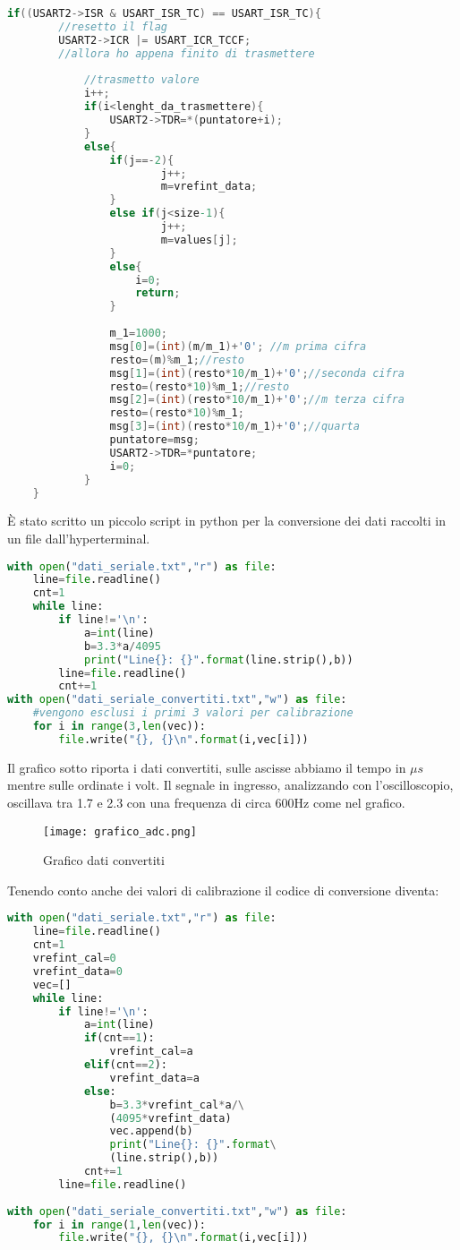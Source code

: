 \documentclass[main.tex]{subfiles}
\begin{document}
\begin{lstlisting}[caption=Interrupt USART2, language=C]
if((USART2->ISR & USART_ISR_TC) == USART_ISR_TC){
		//resetto il flag
		USART2->ICR |= USART_ICR_TCCF;
		//allora ho appena finito di trasmettere
		
			//trasmetto valore
			i++;
			if(i<lenght_da_trasmettere){
				USART2->TDR=*(puntatore+i);
			}
			else{
				if(j==-2){
						j++;
						m=vrefint_data;
				}
				else if(j<size-1){
						j++;
						m=values[j];
				}
				else{
					i=0; 
					return;
				}
				
				m_1=1000;
				msg[0]=(int)(m/m_1)+'0'; //m prima cifra
				resto=(m)%m_1;//resto
				msg[1]=(int)(resto*10/m_1)+'0';//seconda cifra
				resto=(resto*10)%m_1;//resto
				msg[2]=(int)(resto*10/m_1)+'0';//m terza cifra
				resto=(resto*10)%m_1;
				msg[3]=(int)(resto*10/m_1)+'0';//quarta
				puntatore=msg;
				USART2->TDR=*puntatore;
				i=0;
			}
	}
\end{lstlisting}
È stato scritto un piccolo script in python per la conversione dei dati raccolti in un file dall'hyperterminal. 
\begin{lstlisting}[caption=script.py,language=python]
with open("dati_seriale.txt","r") as file:
    line=file.readline()
    cnt=1
    while line:
        if line!='\n':
            a=int(line)
            b=3.3*a/4095
            print("Line{}: {}".format(line.strip(),b))
        line=file.readline()
        cnt+=1
with open("dati_seriale_convertiti.txt","w") as file:
    #vengono esclusi i primi 3 valori per calibrazione
    for i in range(3,len(vec)):
        file.write("{}, {}\n".format(i,vec[i]))
\end{lstlisting}
Il grafico sotto riporta i dati convertiti, sulle ascisse abbiamo il tempo in $\mu s$ mentre sulle ordinate i volt. Il segnale in ingresso, analizzando con l'oscilloscopio, oscillava tra 1.7 e 2.3 con una frequenza di circa 600Hz come nel grafico.
\begin{figure}[H]
    \centering
    \texttt{[image: grafico\_adc.png]}
    \caption{Grafico dati convertiti}
    \label{fig:grafico_adc}
\end{figure}
Tenendo conto anche dei valori di calibrazione il codice di conversione diventa:
\begin{lstlisting}[caption=script(cal).py,language=python]
with open("dati_seriale.txt","r") as file:
    line=file.readline()
    cnt=1
    vrefint_cal=0
    vrefint_data=0
    vec=[]
    while line:
        if line!='\n':
            a=int(line)
            if(cnt==1):
                vrefint_cal=a
            elif(cnt==2):
                vrefint_data=a
            else:
                b=3.3*vrefint_cal*a/\
                (4095*vrefint_data)
                vec.append(b)
                print("Line{}: {}".format\
                (line.strip(),b))
            cnt+=1
        line=file.readline()
        
with open("dati_seriale_convertiti.txt","w") as file:
    for i in range(1,len(vec)):
        file.write("{}, {}\n".format(i,vec[i]))

\end{lstlisting}
\end{document}
